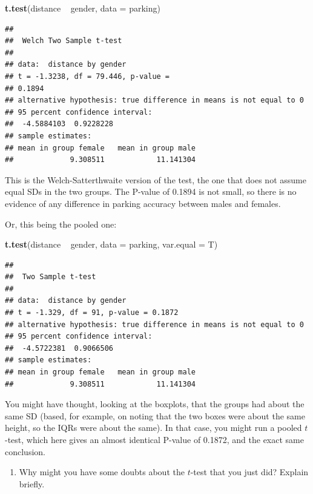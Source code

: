 \documentclass[]{tufte-book}
\newenvironment{Shaded}{}{}
\newcommand{\DataTypeTok}[1]{\textcolor[rgb]{0.56,0.13,0.00}{#1}}
\newcommand{\KeywordTok}[1]{\textcolor[rgb]{0.00,0.44,0.13}{\textbf{#1}}}
\newcommand{\NormalTok}[1]{#1}
\newcommand{\OperatorTok}[1]{\textcolor[rgb]{0.40,0.40,0.40}{#1}}
\newcommand{\StringTok}[1]{\textcolor[rgb]{0.25,0.44,0.63}{#1}}
\providecommand{\tightlist}{%
  \setlength{\itemsep}{0pt}\setlength{\parskip}{0pt}}
\theoremstyle{definition}
\theoremstyle{definition}
\theoremstyle{definition}
\theoremstyle{remark}
\begin{document}
\begin{Shaded}
\begin{Highlighting}[]
\KeywordTok{t.test}\NormalTok{(distance }\OperatorTok{~}\StringTok{ }\NormalTok{gender, }\DataTypeTok{data =}\NormalTok{ parking)}
\end{Highlighting}
\end{Shaded}

\begin{verbatim}
## 
##  Welch Two Sample t-test
## 
## data:  distance by gender
## t = -1.3238, df = 79.446, p-value =
## 0.1894
## alternative hypothesis: true difference in means is not equal to 0
## 95 percent confidence interval:
##  -4.5884103  0.9228228
## sample estimates:
## mean in group female   mean in group male 
##             9.308511            11.141304
\end{verbatim}

This is the Welch-Satterthwaite version of the test, the one that does
not assume equal SDs in the two groups. The P-value of 0.1894 is not
small, so there is no evidence of any difference in parking accuracy
between males and females.

Or, this being the pooled one:

\begin{Shaded}
\begin{Highlighting}[]
\KeywordTok{t.test}\NormalTok{(distance }\OperatorTok{~}\StringTok{ }\NormalTok{gender, }\DataTypeTok{data =}\NormalTok{ parking, }\DataTypeTok{var.equal =}\NormalTok{ T)}
\end{Highlighting}
\end{Shaded}

\begin{verbatim}
## 
##  Two Sample t-test
## 
## data:  distance by gender
## t = -1.329, df = 91, p-value = 0.1872
## alternative hypothesis: true difference in means is not equal to 0
## 95 percent confidence interval:
##  -4.5722381  0.9066506
## sample estimates:
## mean in group female   mean in group male 
##             9.308511            11.141304
\end{verbatim}

You might have thought, looking at the boxplots, that the groups had
about the same SD (based, for example, on noting that the two boxes were
about the same height, so the IQRs were about the same). In that case,
you might run a pooled \(t\)-test, which here gives an almost identical
P-value of 0.1872, and the exact same conclusion.

\begin{enumerate}
\def\labelenumi{(\alph{enumi})}
\setcounter{enumi}{5}
\tightlist
\item
  Why might you have some doubts about the \(t\)-test that you just did?
  Explain briefly.
\end{enumerate}
\end{document}
